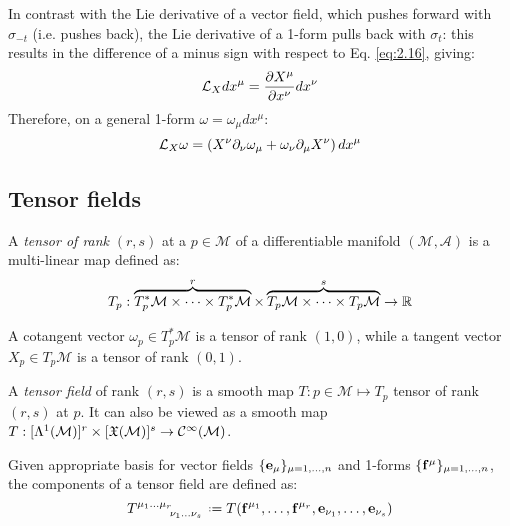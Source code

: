 In contrast with the Lie derivative of a vector field, which pushes forward with $ \sigma_{-t} $ (i.e. pushes back), the Lie derivative of a 1-form pulls back with $ \sigma_t $: this results in the difference of a minus sign with respect to Eq. \ref{eq:2.16}, giving:
\begin{equation}
  \mathcal{L}_X dx^{\mu} = \frac{\partial X^{\mu}}{\partial x^{\nu}} dx^{\nu}
  \label{eq:2.22}
\end{equation}
Therefore, on a general 1-form $ \omega = \omega_{\mu} dx^{\mu} $:
\begin{equation}
  \mathcal{L}_X \omega = \left( X^{\nu} \partial_{\nu} \omega_{\mu} + \omega_{\nu} \partial_{\mu} X^{\nu} \right) dx^{\mu}
  \label{eq:2.23}
\end{equation}

\subsection{Tensor fields}

\begin{definition}
  A \textit{tensor of rank} $ (r,s) $ at a $ p\in\mathcal{M} $ of a differentiable manifold $ (\mathcal{M},\mathcal{A}) $ is a multi-linear map defined as:
  \begin{equation}
    T_p : \overbrace{T^*_p \mathcal{M} \times \dots \times T^*_p \mathcal{M}}^{r} \times \overbrace{T_p \mathcal{M} \times \dots \times T_p \mathcal{M}}^{s} \rightarrow \mathbb{R}
    \label{eq:2.24}
  \end{equation}
\end{definition}

\begin{example}
  A cotangent vector $ \omega_p \in T^*_p \mathcal{M} $ is a tensor of rank $ (1,0) $, while a tangent vector $ X_p \in T_p \mathcal{M} $ is a tensor of rank $ (0,1) $.
\end{example}

\begin{definition}
  A \textit{tensor field} of rank $ (r,s) $ is a smooth map $ T : p \in \mathcal{M} \mapsto T_p $ tensor of rank $ (r,s) $ at $ p $. It can also be viewed as a smooth map $ T : [\Lambda^{1}(\mathcal{M})]^r \times [\mathfrak{X}(\mathcal{M})]^s \rightarrow \mathcal{C}^{\infty}(\mathcal{M}) $.
\end{definition}

Given appropriate basis for vector fields $ \{\mathbf{e}_{\mu}\}_{\mu = 1,\dots,n} $ and 1-forms $ \{\mathbf{f}^{\mu}\}_{\mu = 1,\dots,n} $, the components of a tensor field are defined as:
\begin{equation}
  \tensor{T}{^{\mu_1}^{\dots}^{\mu_r}_{\nu_1}_{\dots}_{\nu_s}} \defeq T(\ve{f}^{\mu_1},\dots,\ve{f}^{\mu_r},\ve{e}_{\nu_1},\dots,\ve{e}_{\nu_s})
  \label{eq:2.25}
\end{equation}

